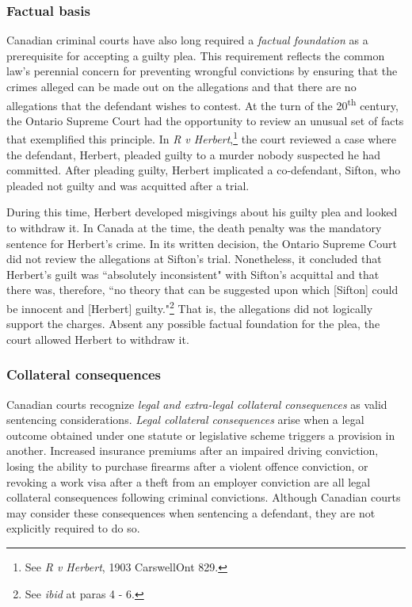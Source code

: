 \subsubsection{Factual basis}

Canadian criminal courts have also long required a \textit{factual foundation} as a prerequisite for accepting a guilty plea. This requirement reflects the common law's perennial concern for preventing wrongful convictions by ensuring that the crimes alleged can be made out on the allegations and that there are no allegations that the defendant wishes to contest. At the turn of the 20\textsuperscript{th} century, the Ontario Supreme Court had the opportunity to review an unusual set of facts that exemplified this principle. In \textit{R v Herbert},\footnote{See \textit{R v Herbert}, 1903 CarswellOnt 829.} the court reviewed a case where the defendant, Herbert, pleaded guilty to a murder nobody suspected he had committed. After pleading guilty, Herbert implicated a co-defendant, Sifton, who pleaded not guilty and was acquitted after a trial. 

During this time, Herbert developed misgivings about his guilty plea and looked to withdraw it. In Canada at the time, the death penalty was the mandatory sentence for Herbert's crime. In its written decision, the Ontario Supreme Court did not review the allegations at Sifton's trial. Nonetheless, it concluded that Herbert's guilt was ``absolutely inconsistent" with Sifton's acquittal and that there was, therefore, ``no theory that can be suggested upon which [Sifton] could be innocent and [Herbert] guilty."\footnote{See \textit{ibid} at paras 4 - 6.} That is, the allegations did not logically support the charges. Absent any possible factual foundation for the plea, the court allowed Herbert to withdraw it.

\subsubsection{Collateral consequences}

Canadian courts recognize \textit{legal and extra-legal collateral consequences} as valid sentencing considerations. \textit{Legal collateral consequences} arise when a legal outcome obtained under one statute or legislative scheme triggers a provision in another. Increased insurance premiums after an impaired driving conviction, losing the ability to purchase firearms after a violent offence conviction, or revoking a work visa after a theft from an employer conviction are all legal collateral consequences following criminal convictions. Although Canadian courts may consider these consequences when sentencing a defendant, they are not explicitly required to do so. 

